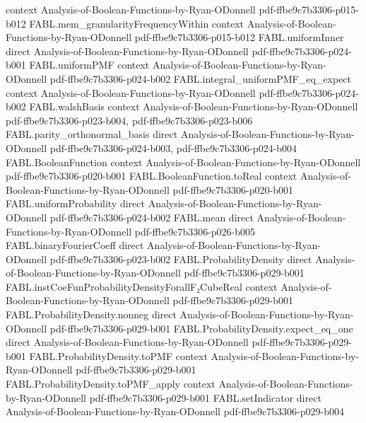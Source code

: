 \begin{theorem}
  {context}
  {Analysis-of-Boolean-Functions-by-Ryan-ODonnell}
  {pdf-ffbe9c7b3306-p015-b012}
\proofstep
  {FABL.mem_granularityFrequencyWithin}
  {context}
  {Analysis-of-Boolean-Functions-by-Ryan-ODonnell}
  {pdf-ffbe9c7b3306-p015-b012}
\proofstep
  {FABL.uniformInner}
  {direct}
  {Analysis-of-Boolean-Functions-by-Ryan-ODonnell}
  {pdf-ffbe9c7b3306-p024-b001}
\proofstep
  {FABL.uniformPMF}
  {context}
  {Analysis-of-Boolean-Functions-by-Ryan-ODonnell}
  {pdf-ffbe9c7b3306-p024-b002}
\proofstep
  {FABL.integral_uniformPMF_eq_expect}
  {context}
  {Analysis-of-Boolean-Functions-by-Ryan-ODonnell}
  {pdf-ffbe9c7b3306-p024-b002}
\proofstep
  {FABL.walshBasis}
  {context}
  {Analysis-of-Boolean-Functions-by-Ryan-ODonnell}
  {pdf-ffbe9c7b3306-p023-b004,
    pdf-ffbe9c7b3306-p023-b006}
\proofstep
  {FABL.parity_orthonormal_basis}
  {direct}
  {Analysis-of-Boolean-Functions-by-Ryan-ODonnell}
  {pdf-ffbe9c7b3306-p024-b003,
    pdf-ffbe9c7b3306-p024-b004}
\proofstep
  {FABL.BooleanFunction}
  {context}
  {Analysis-of-Boolean-Functions-by-Ryan-ODonnell}
  {pdf-ffbe9c7b3306-p020-b001}
\proofstep
  {FABL.BooleanFunction.toReal}
  {context}
  {Analysis-of-Boolean-Functions-by-Ryan-ODonnell}
  {pdf-ffbe9c7b3306-p020-b001}
\proofstep
  {FABL.uniformProbability}
  {direct}
  {Analysis-of-Boolean-Functions-by-Ryan-ODonnell}
  {pdf-ffbe9c7b3306-p024-b002}
\proofstep
  {FABL.mean}
  {direct}
  {Analysis-of-Boolean-Functions-by-Ryan-ODonnell}
  {pdf-ffbe9c7b3306-p026-b005}
\proofstep
  {FABL.binaryFourierCoeff}
  {direct}
  {Analysis-of-Boolean-Functions-by-Ryan-ODonnell}
  {pdf-ffbe9c7b3306-p023-b002}
\proofstep
  {FABL.ProbabilityDensity}
  {direct}
  {Analysis-of-Boolean-Functions-by-Ryan-ODonnell}
  {pdf-ffbe9c7b3306-p029-b001}
\proofstep
  {FABL.instCoeFunProbabilityDensityForallF₂CubeReal}
  {context}
  {Analysis-of-Boolean-Functions-by-Ryan-ODonnell}
  {pdf-ffbe9c7b3306-p029-b001}
\proofstep
  {FABL.ProbabilityDensity.nonneg}
  {direct}
  {Analysis-of-Boolean-Functions-by-Ryan-ODonnell}
  {pdf-ffbe9c7b3306-p029-b001}
\proofstep
  {FABL.ProbabilityDensity.expect_eq_one}
  {direct}
  {Analysis-of-Boolean-Functions-by-Ryan-ODonnell}
  {pdf-ffbe9c7b3306-p029-b001}
\proofstep
  {FABL.ProbabilityDensity.toPMF}
  {context}
  {Analysis-of-Boolean-Functions-by-Ryan-ODonnell}
  {pdf-ffbe9c7b3306-p029-b001}
\proofstep
  {FABL.ProbabilityDensity.toPMF_apply}
  {context}
  {Analysis-of-Boolean-Functions-by-Ryan-ODonnell}
  {pdf-ffbe9c7b3306-p029-b001}
\proofstep
  {FABL.setIndicator}
  {direct}
  {Analysis-of-Boolean-Functions-by-Ryan-ODonnell}
  {pdf-ffbe9c7b3306-p029-b004}
\proofstep

\end{theorem}

